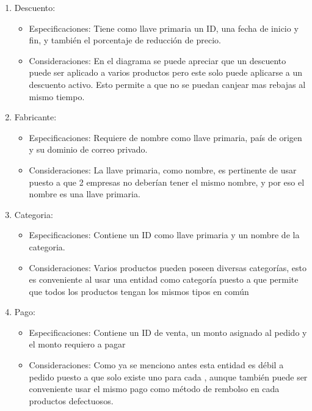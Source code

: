 \documentclass[10pt, a4paper,openany]{report}
\begin{document}
\begin{enumerate}
	\item  Descuento:
	      \begin{itemize}
		      \item Especificaciones:
		            Tiene como llave primaria un ID, una fecha de inicio y fin, y también el porcentaje de reducción de precio.
		      \item Consideraciones:
		            En el diagrama se puede apreciar que un descuento puede ser aplicado a varios productos pero este solo puede aplicarse a un descuento activo. Esto permite a que no se puedan canjear
		            mas rebajas al mismo tiempo.
	      \end{itemize}


	\item  Fabricante:
	      \begin{itemize}
		      \item Especificaciones:
		            Requiere de nombre como llave primaria, país de origen y su dominio de correo privado.
		      \item Consideraciones:
		            La llave primaria, como nombre, es pertinente de usar puesto a que 2 empresas no deberían tener el mismo nombre, y por eso el nombre es una llave primaria.
	      \end{itemize}


	\item  Categoria:
	      \begin{itemize}
		      \item Especificaciones:
		            Contiene un ID como llave primaria y un nombre de la categoria.
		      \item Consideraciones:
		            Varios productos pueden poseen diversas categorías, esto es conveniente al usar una entidad como categoría puesto a que permite que todos los productos tengan los mismos tipos en común
	      \end{itemize}


	\item  Pago:
	      \begin{itemize}
		      \item Especificaciones:
		            Contiene un ID de venta, un monto asignado al pedido y el monto requiero a pagar
		      \item Consideraciones:
		            Como ya se menciono antes esta entidad es débil a pedido puesto a que solo existe uno para cada , aunque también puede ser conveniente usar el mismo pago
		            como método de rembolso en cada  productos defectuosos.
	      \end{itemize}


\end{enumerate}
\end{document}
